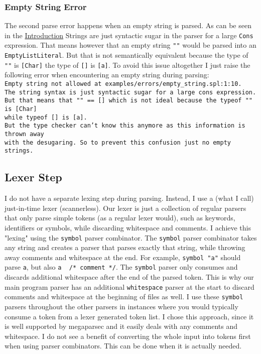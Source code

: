 \documentclass{report}
\begin{document}
\subsubsection{Empty String Error}
The second parse error happens when an empty string is parsed. 
As can be seen in the \hyperref[sec:hello-world-example]{Introduction} Strings are just syntactic sugar in the parser for a large \texttt{Cons} expression. 
That means however that an empty string \texttt{""} would be parsed into an \texttt{EmptyListLiteral}. 
But that is not semantically equivalent because the type of \texttt{""} is \texttt{\textcolor{type}{[Char]}} the type of \texttt{\textcolor{literal}{[]}} is \texttt{\textcolor{type}{[a]}}. To avoid this issue altogether I just raise the following error when encountering an empty string during parsing:
\vspace{0.1cm}\\
\noindent \texttt{\textcolor{error}{Empty string not allowed at} \textcolor{filename}{examples/errors/empty\_string.spl:1:10}.\\The string syntax is just syntactic sugar for a large cons expression.\\
But that means that \textcolor{literal}{""} == \textcolor{literal}{[]} which is not ideal because the typeof \textcolor{literal}{""} is \textcolor{type}{[Char]} \\while typeof \textcolor{literal}{[]} is \textcolor{type}{[a]}.\\ But the type checker can't know this anymore as this information is thrown away\\ with the desugaring. So to prevent this confusion just no empty strings.}

\subsection{Lexer Step}

I do not have a separate lexing step during parsing. Instead, I use a (what I call) just‑in‑time lexer (scannerless).
Our lexer is just a collection of regular parsers that only parse simple tokens (as a regular lexer would), such as keywords, identifiers or symbols, while discarding whitespace and comments.  I achieve this "lexing" using the \texttt{symbol} parser combinator. The \texttt{symbol} parser combinator takes any string and creates a parser that parses exactly that string, while throwing away comments and whitespace at the end. For example, \texttt{symbol "a"} should parse \texttt{a}, but also \texttt{a$~~~~~$/* comment */}. The \texttt{symbol} parser only consumes and discards additional whitespace after the end of the parsed token. This is why our main program parser has an additional \texttt{whitespace} parser at the start to discard comments and whitespace at the beginning of files as well. I use these \texttt{symbol} parsers throughout the other parsers in instances where you would typically consume a token from a lexer generated token list. I chose this approach, since it is well supported by megaparsec and it easily deals with any comments and whitespace. I do not see a benefit of converting the whole input into tokens first when using parser combinators. This can be done when it is actually needed.
\end{document}

